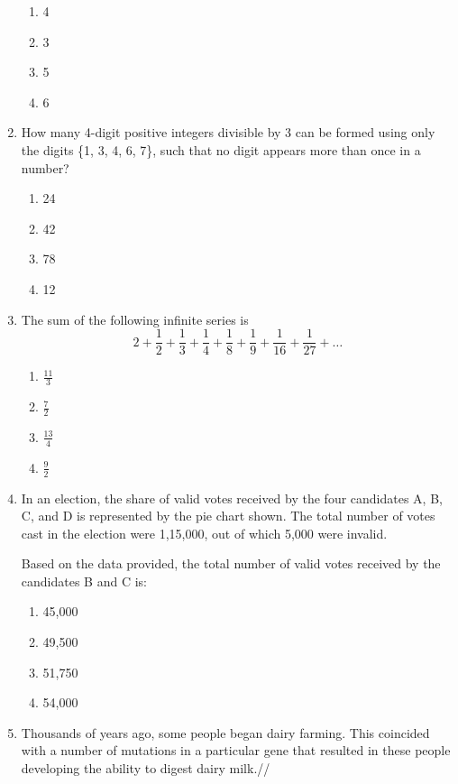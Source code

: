 \documentclass[journal,12pt,onecolumn]{IEEEtran}
\theoremstyle{remark}
\begin{document}
\begin{enumerate}
\begin{enumerate}
    \item 4
    \item 3
    \item 5
    \item 6
\end{enumerate}
\item How many 4-digit positive integers divisible by 3 can be formed using only the digits \{1, 3, 4, 6, 7\}, such that no digit appears more than once in a number?
\begin{enumerate}
    \item 24
    \item 42
    \item 78
    \item 12
\end{enumerate}
\item The sum of the following infinite series is
$$2 + \frac{1}{2} + \frac{1}{3} + \frac{1}{4} + \frac{1}{8} + \frac{1}{9} + \frac{1}{16} + \frac{1}{27} + \dots $$
\begin{enumerate}
     \item $\frac{11}{3}$
     \item $\frac{7}{2}$
     \item $\frac{13}{4}$
     \item $\frac{9}{2}$
\end{enumerate}
\item In an election, the share of valid votes received by the four candidates A, B, C, and D is represented by the pie chart shown. The total number of votes cast in the election were 1,15,000, out of which 5,000 were invalid.
\begin{center}
	
\end{center}
Based on the data provided, the total number of valid votes received by the candidates B and C is:

\begin{enumerate}
    \item 45,000
    \item 49,500
    \item 51,750
    \item 54,000
\end{enumerate}
\item Thousands of years ago, some people began dairy farming. This coincided with a number of mutations in a particular gene that resulted in these people developing the ability to digest dairy milk.//



\end{enumerate}
\end{document}
